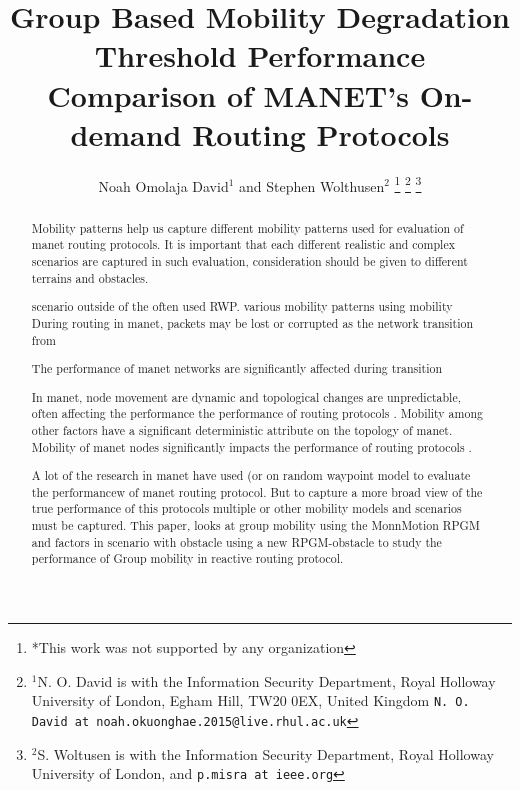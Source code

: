 \documentclass[letterpaper, 10 pt, conference]{ieeeconf}  %
\title{\LARGE \bf
Group Based Mobility Degradation Threshold Performance Comparison of MANET's On-demand Routing Protocols
}
\author{Noah Omolaja David$^{1}$ and Stephen Wolthusen$^{2}$%
\thanks{*This work was not supported by any organization}%
\thanks{$^{1}$N. O. David is with the Information Security Department, Royal Holloway University of London,
        Egham Hill, TW20 0EX, United Kingdom 
        {\tt\small N. O. David at noah.okuonghae.2015@live.rhul.ac.uk}}%
\thanks{$^{2}$S. Woltusen is with the Information Security Department, Royal Holloway University of London, and 
        {\tt\small p.misra at ieee.org}}%
}
\begin{document}
\maketitle
\thispagestyle{empty}
\pagestyle{empty}
\begin{abstract}




Mobility patterns help us capture different mobility patterns used for evaluation of manet routing protocols. It is important that each different realistic and complex scenarios are captured in such evaluation, consideration should be given to different terrains and obstacles.

scenario outside of the often used RWP. various mobility patterns using mobility
During routing in manet, packets may be lost or corrupted as the network transition from


The performance of manet networks are significantly affected during transition 

In manet, node movement are dynamic and topological changes are unpredictable, often affecting the performance the performance of routing protocols \cite{Broch1998AProtocols}. Mobility among other factors have a significant deterministic attribute on the topology of manet. Mobility of manet nodes significantly impacts the performance of routing protocols \cite{Broch1998AProtocols}.

A lot of the research in manet have used (or on random waypoint model to evaluate the performancew of manet routing protocol. But to capture a more broad view of the true performance of this protocols multiple or other mobility models and scenarios must be captured. This paper, looks at group mobility using the MonnMotion RPGM and factors in scenario with obstacle using a new RPGM-obstacle to study the performance of Group mobility in reactive routing protocol.


\end{abstract}
\end{document}
